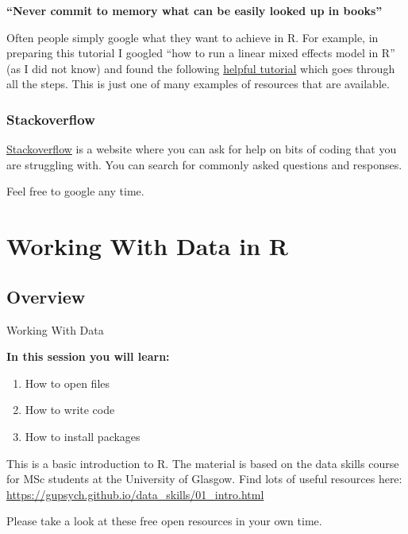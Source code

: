 \documentclass[]{book}
\providecommand{\tightlist}{%
  \setlength{\itemsep}{0pt}\setlength{\parskip}{0pt}}
\begin{document}
\textbf{``Never commit to memory what can be easily looked up in books''}

Often people simply google what they want to achieve in R. For example, in preparing this tutorial I googled ``how to run a linear mixed effects model in R'' (as I did not know) and found the following \href{https://ourcodingclub.github.io/2017/03/15/mixed-models.html}{helpful tutorial} which goes through all the steps. This is just one of many examples of resources that are available.

\hypertarget{stackoverflow}{%
\subsection{Stackoverflow}\label{stackoverflow}}

\href{https://stackoverflow.com}{Stackoverflow} is a website where you can ask for help on bits of coding that you are struggling with. You can search for commonly asked questions and responses.

Feel free to google any time.

\hypertarget{working-with-data-in-r}{%
\chapter{Working With Data in R}\label{working-with-data-in-r}}

\hypertarget{overview-2}{%
\section{Overview}\label{overview-2}}

{Working With Data}

\textbf{In this session you will learn:}

\begin{enumerate}
\def\labelenumi{\arabic{enumi}.}
\tightlist
\item
  How to open files
\item
  How to write code
\item
  How to install packages
\end{enumerate}

This is a basic introduction to R. The material is based on the data skills course for MSc students at the University of Glasgow. Find lots of useful resources here: \url{https://gupsych.github.io/data_skills/01_intro.html}

Please take a look at these free open resources in your own time.
\end{document}
